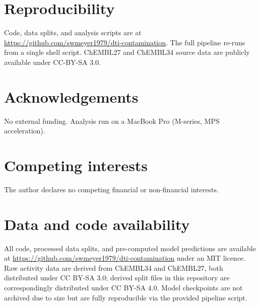 \documentclass[11pt,a4paper]{article}
\begin{document}
\section*{Reproducibility}

Code, data splits, and analysis scripts are at\\
\url{https://github.com/swmeyer1979/dti-contamination}.
The full pipeline re-runs from a single shell script.
ChEMBL27 and ChEMBL34 source data are publicly available under CC-BY-SA 3.0.

\section*{Acknowledgements}

No external funding. Analysis run on a MacBook Pro (M-series, MPS
acceleration).

\section*{Competing interests}

The author declares no competing financial or non-financial interests.

\section*{Data and code availability}

All code, processed data splits, and pre-computed model predictions are
available at \url{https://github.com/swmeyer1979/dti-contamination} under an
MIT licence.
Raw activity data are derived from ChEMBL34 and ChEMBL27, both distributed
under CC BY-SA 3.0; derived split files in this repository are correspondingly
distributed under CC BY-SA 4.0.
Model checkpoints are not archived due to size but are fully reproducible via
the provided pipeline script.



\end{document}
